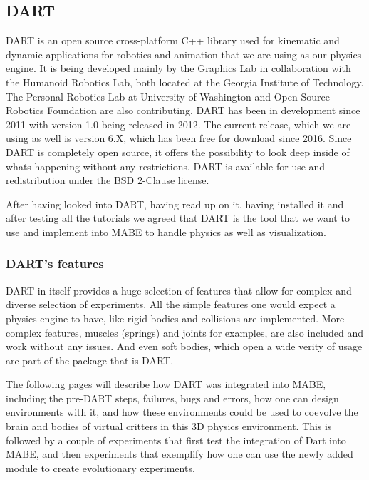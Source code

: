 \documentclass[12pt,oneside,listof=totoc,paper=a4,headings=small]{scrbook}
\begin{document}
\subsection{DART}
DART \cite{lee2018dart} is an open source cross-platform C++ library used for kinematic and dynamic applications for robotics and animation that we are using as our physics engine. It is being developed mainly by the Graphics Lab in collaboration with the Humanoid Robotics Lab, both located at the Georgia Institute of Technology. The Personal Robotics Lab at University of Washington and Open Source Robotics Foundation are also contributing.
DART has been in development since 2011 with version 1.0 being released in 2012. The current release, which we are using as well is version 6.X, which has been free for download since 2016.
Since DART is completely open source, it offers the possibility to look deep inside of whats happening without any restrictions.
DART is available for use and redistribution under the BSD 2-Clause license.

After having looked into DART, having read up on it, having installed it and after testing all the tutorials we agreed that DART is the tool that we want to use and implement into MABE to handle physics as well as visualization. 


\subsubsection{DART's features}

DART in itself provides a huge selection of features that allow for complex and diverse selection of experiments. All the simple features one would expect a physics engine to have, like rigid bodies and collisions are implemented. More complex features, muscles (springs) and joints for examples, are also included and work without any issues. And even soft bodies, which open a wide verity of usage are part of the package that is DART.

\newpage

The following pages will describe how DART was integrated into MABE, including the pre-DART steps, failures, bugs and errors, how one can design environments with it, and how these environments could be used to coevolve the brain and bodies of virtual critters in this 3D physics environment. This is followed by a couple of experiments that first test the integration of Dart into MABE, and then experiments that exemplify how one can use the newly added module to create evolutionary experiments. %
\end{document}
